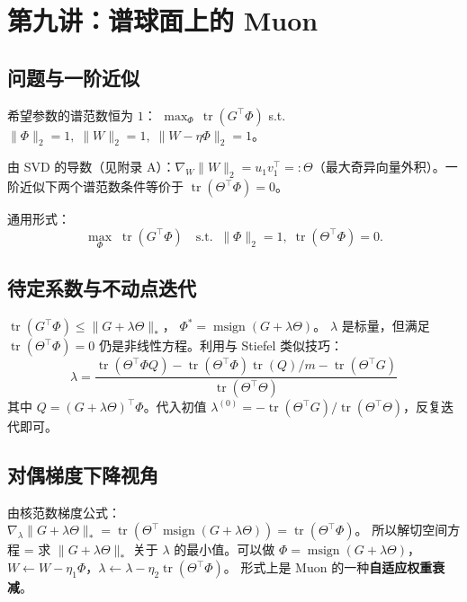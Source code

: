 \documentclass[11pt,a4paper]{article}
\theoremstyle{mythm}
\theoremstyle{mydef}
\newcommand{\tr}{\operatorname{tr}}
\newcommand{\msign}{\operatorname{msign}}
\newcommand{\nuc}{\ast}
\begin{document}
\section{第九讲：谱球面上的 Muon}\label{sec:spec-sphere}

\subsection{问题与一阶近似}

希望参数的谱范数恒为 $1$：
$\max_\Phi\,\tr(G^\top\Phi)$ s.t.\ $\|\Phi\|_2=1,\;\|W\|_2=1,\;\|W-\eta\Phi\|_2=1$。

由 SVD 的导数（见附录 A）：$\nabla_W\|W\|_2 = u_1 v_1^\top =: \Theta$（最大奇异向量外积）。一阶近似下两个谱范数条件等价于 $\tr(\Theta^\top\Phi) = 0$。

通用形式：
\begin{equation}
\max_\Phi\; \tr(G^\top\Phi)\quad\text{s.t.}\;\;\|\Phi\|_2=1,\; \tr(\Theta^\top\Phi)=0.
\end{equation}

\subsection{待定系数与不动点迭代}
$\tr(G^\top\Phi) \le \|G+\lambda\Theta\|_\nuc$，
$\Phi^\ast = \msign(G+\lambda\Theta)$。
$\lambda$ 是标量，但满足 $\tr(\Theta^\top\Phi)=0$ 仍是非线性方程。利用与 Stiefel 类似技巧：
\begin{equation}
\boxed{\quad\lambda = \frac{\tr(\Theta^\top \Phi Q) - \tr(\Theta^\top\Phi)\tr(Q)/m - \tr(\Theta^\top G)}{\tr(\Theta^\top \Theta)}\quad}
\end{equation}
其中 $Q = (G+\lambda\Theta)^\top \Phi$。代入初值 $\lambda^{(0)} = -\tr(\Theta^\top G)/\tr(\Theta^\top\Theta)$，反复迭代即可。

\subsection{对偶梯度下降视角}
由核范数梯度公式：
$\nabla_\lambda \|G+\lambda\Theta\|_\nuc = \tr(\Theta^\top \msign(G+\lambda\Theta)) = \tr(\Theta^\top\Phi)$。
所以解切空间方程 = 求 $\|G+\lambda\Theta\|_\nuc$ 关于 $\lambda$ 的最小值。可以做
$\Phi=\msign(G+\lambda\Theta)$，$W\leftarrow W-\eta_1\Phi$，$\lambda\leftarrow \lambda-\eta_2\tr(\Theta^\top\Phi)$。
形式上是 Muon 的一种\textbf{自适应权重衰减}。
\end{document}
